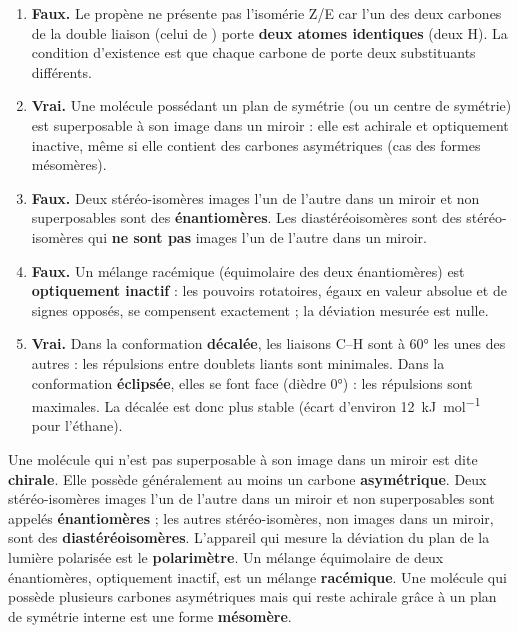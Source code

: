\documentclass[11pt]{article}
\newcommand{\cle}[1]{{\popxbold\color{popdark}#1}}
\begin{document}
\begin{corrige}
\begin{enumerate}
\item \textbf{Faux.} Le propène  ne présente pas l'isomérie Z/E car l'un des deux carbones de la double liaison (celui de ) porte \textbf{deux atomes identiques} (deux H). La condition d'existence est que chaque carbone de  porte deux substituants différents.
\item \textbf{Vrai.} Une molécule possédant un plan de symétrie (ou un centre de symétrie) est superposable à son image dans un miroir : elle est \cle{achirale} et optiquement inactive, même si elle contient des carbones asymétriques (cas des formes mésomères).
\item \textbf{Faux.} Deux stéréo-isomères images l'un de l'autre dans un miroir et non superposables sont des \textbf{énantiomères}. Les \cle{diastéréoisomères} sont des stéréo-isomères qui \textbf{ne sont pas} images l'un de l'autre dans un miroir.
\item \textbf{Faux.} Un mélange racémique (équimolaire des deux énantiomères) est \textbf{optiquement inactif} : les pouvoirs rotatoires, égaux en valeur absolue et de signes opposés, se compensent exactement ; la déviation mesurée est nulle.
\item \textbf{Vrai.} Dans la conformation \textbf{décalée}, les liaisons C--H sont à \ang{60} les unes des autres : les répulsions entre doublets liants sont minimales. Dans la conformation \textbf{éclipsée}, elles se font face (dièdre \ang{0}) : les répulsions sont maximales. La décalée est donc plus stable (écart d'environ \SI{12}{kJ.mol^{-1}} pour l'éthane).
\end{enumerate}
\end{corrige}

\begin{corrige}
Une molécule qui n'est pas superposable à son image dans un miroir est dite \textbf{chirale}. Elle possède généralement au moins un carbone \textbf{asymétrique}. Deux stéréo-isomères images l'un de l'autre dans un miroir et non superposables sont appelés \textbf{énantiomères} ; les autres stéréo-isomères, non images dans un miroir, sont des \textbf{diastéréoisomères}. L'appareil qui mesure la déviation du plan de la lumière polarisée est le \textbf{polarimètre}. Un mélange équimolaire de deux énantiomères, optiquement inactif, est un mélange \textbf{racémique}. Une molécule qui possède plusieurs carbones asymétriques mais qui reste achirale grâce à un plan de symétrie interne est une forme \textbf{mésomère}.
\end{corrige}
\end{document}
